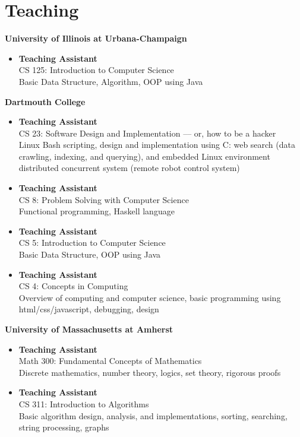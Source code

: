 
\section{\sc Teaching}

{\bf University of Illinois at Urbana-Champaign}
\begin{itemize}
\item {\bf Teaching Assistant} \\ CS 125: Introduction to Computer
  Science \\ Basic Data Structure, Algorithm, OOP using Java
\end{itemize}

{\bf Dartmouth College}
\begin{itemize}
\item {\bf Teaching Assistant} \\ CS 23: Software Design and
  Implementation --– or, how to be a hacker \\ Linux Bash scripting,
  design and implementation using C: web search (data crawling,
  indexing, and querying), and embedded Linux environment distributed
  concurrent system (remote robot control system)
\item {\bf Teaching Assistant} \\ CS 8: Problem Solving with Computer
  Science \\ Functional programming, Haskell language
\item {\bf Teaching Assistant} \\ CS 5: Introduction to Computer
  Science \\ Basic Data Structure, OOP using Java
\item {\bf Teaching Assistant} \\ CS 4: Concepts in Computing
  \\ Overview of computing and computer science, basic programming
  using html/css/javascript, debugging, design
\end{itemize}

{\bf University of Massachusetts at Amherst}
\begin{itemize}
\item {\bf Teaching Assistant} \\ Math 300: Fundamental Concepts of
  Mathematics \\ Discrete mathematics, number theory, logics, set
  theory, rigorous proofs
\item {\bf Teaching Assistant} \\ CS 311: Introduction to Algorithms \\ Basic
  algorithm design, analysis, and implementations, sorting, searching,
  string processing, graphs
\end{itemize}
